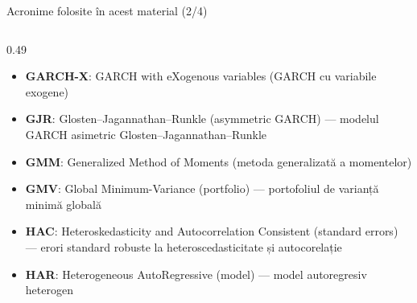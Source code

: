 \begin{frame}{Acronime folosite în acest material (2/4)}
\begin{columns}[T]
\begin{column}{0.49\textwidth}
\begin{itemize}
    \item \textbf{GARCH-X}: GARCH with eXogenous variables (GARCH cu variabile exogene)
    \item \textbf{GJR}: Glosten–Jagannathan–Runkle (asymmetric GARCH) — modelul GARCH asimetric Glosten–Jagannathan–Runkle
    \item \textbf{GMM}: Generalized Method of Moments (metoda generalizată a momentelor)
    \item \textbf{GMV}: Global Minimum-Variance (portfolio) — portofoliul de varianță minimă globală
    \item \textbf{HAC}: Heteroskedasticity and Autocorrelation Consistent (standard errors) — erori standard robuste la heteroscedasticitate și autocorelație
    \item \textbf{HAR}: Heterogeneous AutoRegressive (model) — model autoregresiv heterogen
\end{itemize}
\end{column}
\end{columns}
\end{frame}
